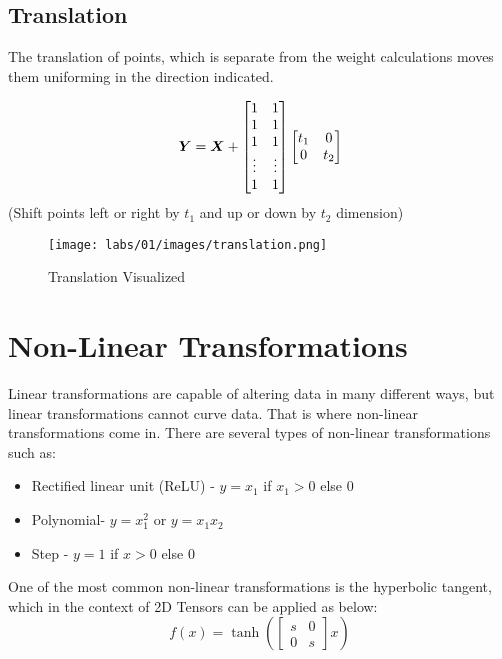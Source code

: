 \subsection{Translation}
The translation of points, which is separate from the weight calculations moves them uniforming in the direction indicated.

\[ \matr{Y} = \matr{X} 
+ \begin{bmatrix}
    1 & 1 \\
    1 & 1 \\
    1 & 1 \\
    \vdots & \vdots  \\
    1 & 1
\end{bmatrix}
\begin{bmatrix}
    t_1 & 0\\
    0 & t_2
\end{bmatrix} \] 
(Shift points left or right by \(t_1\) and up or down by  \(t_2\) dimension)

\begin{figure}[ht]
\begin{center}
\texttt{[image: labs/01/images/translation.png]}
\end{center} 
\caption{Translation Visualized}
\end{figure}

\section{Non-Linear Transformations}
Linear transformations are capable of altering data in many different ways, but linear transformations cannot curve data. 
That is where non-linear transformations come in. There are several types of non-linear transformations such as:

\begin{itemize}
\item
Rectified linear unit (ReLU) - \(y = x_1\) if \(x_1 > 0\) else $0$ 
\item
Polynomial- \(y = x_1^2\) or \(y = x_1 x_2\)
\item
Step - \(y = 1\) if \(x > 0 \) else $0$ 

\end{itemize}

One of the most common non-linear transformations is the hyperbolic tangent, which in the context of 2D Tensors can be applied as below:
\[f(x) = \tanh(
\begin{bmatrix}
s & 0\\
0 & s
\end{bmatrix}
x)\]

